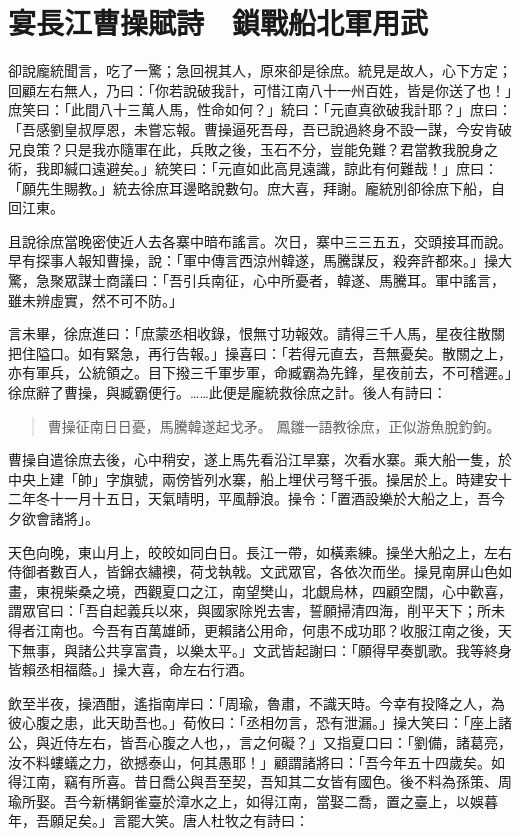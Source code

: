 
\chapter{宴長江曹操賦詩　鎖戰船北軍用武}

卻說龐統聞言，吃了一驚；急回視其人，原來卻是徐庶。統見是故人，心下方定；回顧左右無人，乃曰：「你若說破我計，可惜江南八十一州百姓，皆是你送了也！」庶笑曰：「此間八十三萬人馬，性命如何？」統曰：「元直真欲破我計耶？」庶曰：「吾感劉皇叔厚恩，未嘗忘報。曹操逼死吾母，吾已說過終身不設一謀，今安肯破兄良策？只是我亦隨軍在此，兵敗之後，玉石不分，豈能免難？君當教我脫身之術，我即緘口遠避矣。」統笑曰：「元直如此高見遠識，諒此有何難哉！」庶曰：「願先生賜教。」統去徐庶耳邊略說數句。庶大喜，拜謝。龐統別卻徐庶下船，自回江東。

且說徐庶當晚密使近人去各寨中暗布謠言。次日，寨中三三五五，交頭接耳而說。早有探事人報知曹操，說：「軍中傳言西涼州韓遂，馬騰謀反，殺奔許都來。」操大驚，急聚眾謀士商議曰：「吾引兵南征，心中所憂者，韓遂、馬騰耳。軍中謠言，雖未辨虛實，然不可不防。」

言未畢，徐庶進曰：「庶蒙丞相收錄，恨無寸功報效。請得三千人馬，星夜往散關把住隘口。如有緊急，再行告報。」操喜曰：「若得元直去，吾無憂矣。散關之上，亦有軍兵，公統領之。目下撥三千軍步軍，命臧霸為先鋒，星夜前去，不可稽遲。」徐庶辭了曹操，與臧霸便行。……此便是龐統救徐庶之計。後人有詩曰：

\begin{quote}
曹操征南日日憂，馬騰韓遂起戈矛。
鳳雛一語教徐庶，正似游魚脫釣鉤。
\end{quote}

曹操自遣徐庶去後，心中稍安，遂上馬先看沿江旱寨，次看水寨。乘大船一隻，於中央上建「帥」字旗號，兩傍皆列水寨，船上埋伏弓弩千張。操居於上。時建安十二年冬十一月十五日，天氣晴明，平風靜浪。操令：「置酒設樂於大船之上，吾今夕欲會諸將」。

天色向晚，東山月上，皎皎如同白日。長江一帶，如橫素練。操坐大船之上，左右侍御者數百人，皆錦衣繡襖，荷戈執戟。文武眾官，各依次而坐。操見南屏山色如畫，東視柴桑之境，西觀夏口之江，南望樊山，北覷烏林，四顧空闊，心中歡喜，謂眾官曰：「吾自起義兵以來，與國家除兇去害，誓願掃清四海，削平天下；所未得者江南也。今吾有百萬雄師，更賴諸公用命，何患不成功耶？收服江南之後，天下無事，與諸公共享富貴，以樂太平。」文武皆起謝曰：「願得早奏凱歌。我等終身皆賴丞相福蔭。」操大喜，命左右行酒。

飲至半夜，操酒酣，遙指南岸曰：「周瑜，魯肅，不識天時。今幸有投降之人，為彼心腹之患，此天助吾也。」荀攸曰：「丞相勿言，恐有泄漏。」操大笑曰：「座上諸公，與近侍左右，皆吾心腹之人也，，言之何礙？」又指夏口曰：「劉備，諸葛亮，汝不料螻蟻之力，欲撼泰山，何其愚耶！」顧謂諸將曰：「吾今年五十四歲矣。如得江南，竊有所喜。昔日喬公與吾至契，吾知其二女皆有國色。後不料為孫策、周瑜所娶。吾今新構銅雀臺於漳水之上，如得江南，當娶二喬，置之臺上，以娛暮年，吾願足矣。」言罷大笑。唐人杜牧之有詩曰：

